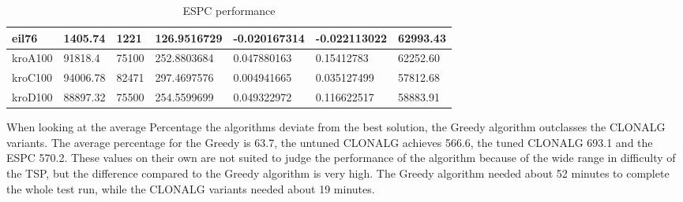 \begin{table}[H]
\begin{tabular}{|l|p{2cm}|p{1.6cm}|p{2.2cm}|p{2.4cm}|p{2.4cm}|p{1.7cm}|}
		eil76     & 1405.74       & 1221       & 126.9516729     & -0.020167314            & -0.022113022      & 62993.43           \\ \hline
		kroA100   & 91818.4       & 75100      & 252.8803684     & 0.047880163             & 0.15412783        & 62252.60           \\ \hline
		kroC100   & 94006.78      & 82471      & 297.4697576     & 0.004941665             & 0.035127499       & 57812.68           \\ \hline
		kroD100   & 88897.32      & 75500      & 254.5599699     & 0.049322972             & 0.116622517       & 58883.91           \\ \hline
	\end{tabular}
	\caption{ESPC performance}
	\label{tab:espc}
\end{table}
When looking at the average Percentage the algorithms deviate from the best solution, the Greedy algorithm outclasses the CLONALG variants. The average percentage for the Greedy is 63.7, the untuned CLONALG achieves 566.6, the tuned CLONALG 693.1 and the ESPC 570.2. These values on their own are not suited to judge the performance of the algorithm because of the wide range in difficulty of the TSP, but the difference compared to the Greedy algorithm is very high. The Greedy algorithm needed about 52 minutes to complete the whole test run, while the CLONALG variants needed about 19 minutes.

